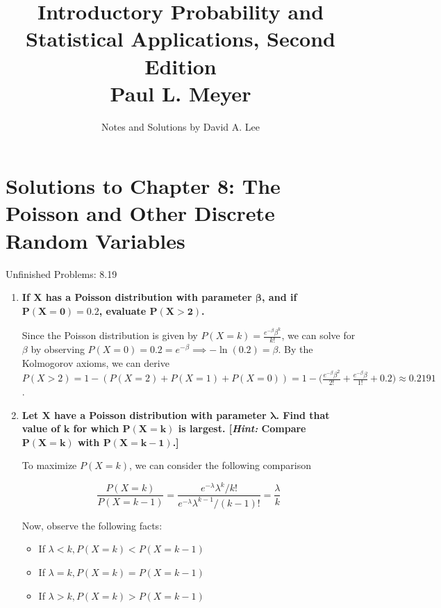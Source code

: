 \documentclass[10pt, oneside]{article}   	%
\title{Introductory Probability and Statistical Applications, Second Edition \\
\large{Paul L. Meyer}}
\author{Notes and Solutions by David A. Lee}
\date{}							%
\theoremstyle{definition}
\begin{document}
\maketitle
\section*{Solutions to Chapter 8: The Poisson and Other Discrete Random Variables}

Unfinished Problems: 8.19

\begin{enumerate}[label=8.\arabic*]
\itemsep0em 
\item  \begin{tcolorbox}[
  colback=Cerulean!5!white,
  colframe=Cerulean!75!black]
\textbf{If $\bm{X}$ has a Poisson distribution with parameter $\bm{\beta}$, and if $\bm{P(X = 0) = 0.2}$, evaluate $\bm{P(X > 2)}$.}
\end{tcolorbox}

Since the Poisson distribution is given by $P(X = k) = \frac{e^{-\beta} \beta^k}{k!}$, we can solve for $\beta$ by observing $P(X = 0) = 0.2 = e^{-\beta} \implies -\ln(0.2) = \beta$. By the Kolmogorov axioms, we can derive $P(X > 2) = 1 - (P(X = 2) + P(X = 1) + P(X = 0)) = 1 - \Big( \frac{e^{-\beta} \beta^2}{2!} + \frac{e^{-\beta} \beta}{1!} + 0.2 \Big) \approx \boxed{0.2191}$.

\item  \begin{tcolorbox}[
  colback=Cerulean!5!white,
  colframe=Cerulean!75!black]
\textbf{Let $\bm{X}$ have a Poisson distribution with parameter $\bm{\lambda}$. Find that value of $\bm{k}$ for which $\bm{P(X = k)}$ is largest. [\textit{Hint:} Compare $\bm{P(X = k)}$ with $\bm{P(X = k - 1)}$.]}
\end{tcolorbox}

To maximize $P(X = k)$, we can consider the following comparison

\[ \frac{P(X = k)}{P(X = k - 1)} = \frac{e^{-\lambda} \lambda^k / k!}{ e^{-\lambda} \lambda^{k-1} / (k-1)!} = \frac{\lambda}{k}\]

Now, observe the following facts:

\begin{itemize}
\item If $\lambda < k, P(X = k) < P(X = k - 1)$
\item If $\lambda = k, P(X = k) = P(X = k - 1)$
\item If $\lambda > k, P(X = k) > P(X = k - 1)$
\end{itemize}


\end{enumerate}
\end{document}
